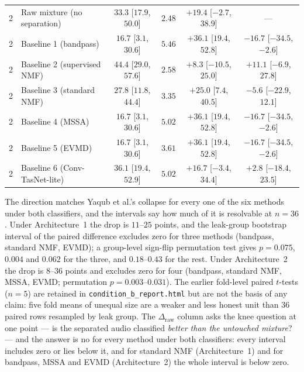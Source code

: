 \documentclass[11pt]{article}
\begin{document}
\begin{table}[H]
\begin{tabular}{@{}llcccc@{}}
2 & Raw mixture (no separation) & $33.3$ [$17.9$, $50.0$] & $2.48$ & $+19.4$ [$-2.7$, $38.9$] & --- \\
2 & Baseline 1 (bandpass) & $16.7$ [$3.1$, $30.6$] & $5.46$ & $+36.1$ [$19.4$, $52.8$] & $-16.7$ [$-34.5$, $-2.6$] \\
2 & Baseline 2 (supervised NMF) & $44.4$ [$29.0$, $57.6$] & $2.58$ & $+8.3$ [$-10.5$, $25.0$] & $+11.1$ [$-6.9$, $27.8$] \\
2 & Baseline 3 (standard NMF) & $27.8$ [$11.8$, $44.4$] & $3.35$ & $+25.0$ [$7.4$, $40.5$] & $-5.6$ [$-22.9$, $12.1$] \\
2 & Baseline 4 (MSSA) & $16.7$ [$3.1$, $30.6$] & $5.02$ & $+36.1$ [$19.4$, $52.8$] & $-16.7$ [$-34.5$, $-2.6$] \\
2 & Baseline 5 (EVMD) & $16.7$ [$3.1$, $30.6$] & $3.61$ & $+36.1$ [$19.4$, $52.8$] & $-16.7$ [$-34.5$, $-2.6$] \\
2 & Baseline 6 (Conv-TasNet-lite) & $36.1$ [$19.4$, $52.9$] & $5.02$ & $+16.7$ [$-3.4$, $34.4$] & $+2.8$ [$-18.4$, $23.5$] \\
\bottomrule
\end{tabular}
\end{table}

The direction matches Yaqub et al.'s collapse for every one of the six
methods under both classifiers, and the intervals say how much of it is
resolvable at $n{=}36$. Under Architecture~1 the drop is $11$--$25$ points,
and the leak-group bootstrap interval of the paired difference excludes
zero for three methods (bandpass, standard NMF, EVMD); a group-level
sign-flip permutation test gives $p = 0.075$, $0.004$ and $0.062$ for the
three, and $0.18$--$0.43$ for the rest. Under Architecture~2 the drop is
$8$--$36$ points and excludes zero for four (bandpass, standard NMF, MSSA,
EVMD; permutation $p = 0.003$--$0.031$). The earlier fold-level paired
$t$-tests ($n{=}5$) are retained in \texttt{condition\_b\_report.html}
but are not the basis of any claim: five fold means of unequal size are a
weaker and less honest unit than 36 paired rows resampled by leak group.
The $\Delta_{\text{raw}}$ column asks the knee question at one point ---
is the separated audio classified \emph{better than the untouched
mixture}? --- and the answer is no for every method under both
classifiers: every interval includes zero or lies below it, and for
standard NMF (Architecture~1) and for bandpass, MSSA and EVMD
(Architecture~2) the whole interval is below zero.
\end{document}
